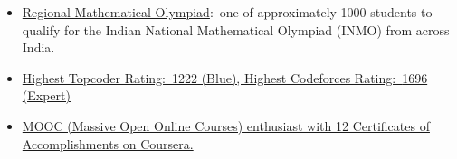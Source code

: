 \documentclass[10pt,a4paper]{article}
\begin{document}
\begin{itemize}[labelindent=1.5em,labelsep=-0.3cm,leftmargin=*]
\end{itemize}


\spacedhrule{0.5em}{-0.4em}

\vspace{0.15cm}
\begin{itemize}[labelindent=1.5em,labelsep=-0.3cm,leftmargin=*]
\item \headedsubsection 
{{\normalfont \href{http://www.isical.ac.in/~rmo/}{Regional Mathematical Olympiad}:~one of approximately 1000 students to qualify for the Indian National Mathematical Olympiad (INMO) from across India. 
}}{{{}}}
{}

\item \headedsubsection 
{\href{}{\normalfont Highest Topcoder Rating:~\href{https://www.topcoder.com/members/f1zz0_13/details/?track=DATA_SCIENCE&subTrack=SRM&tab=statistics}{1222} (Blue), Highest Codeforces Rating:~\href{http://codeforces.com/profile/thatDarkHorse}{1696} (Expert) 
	}}{{{}}}{{}}

\item \headedsubsection 
{\href{}{\normalfont MOOC (Massive Open Online Courses) enthusiast with 12 Certificates of Accomplishments on Coursera.
}}{{{}}}
{}


\end{itemize}
\end{document}
